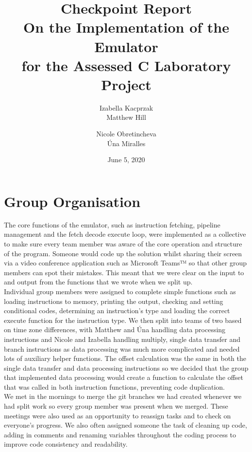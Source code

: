 \documentclass[11pt]{article}
\title{Checkpoint Report\\
\large On the Implementation of the Emulator \\
       for the Assessed C Laboratory Project}
\author{
    Izabella Kacprzak\\
    Matthew Hill
    \and 
    Nicole Obretincheva\\
    \'Una Miralles}
\date{June 5, 2020}
\begin{document}
\maketitle



\section{Group Organisation}
The core functions of the emulator, such as instruction fetching, pipeline management and the fetch decode execute loop, were implemented as a collective to make sure every team member was aware of the core operation and structure of the program. Someone would code up the solution whilst sharing their screen via a video conference application such as Microsoft Teams™ so that other group members can spot their mistakes. This meant that we were clear on the input to and output from the functions that we wrote when we split up.\\ 
\indent Individual group members were assigned to complete simple functions such as loading instructions to memory, printing the output, checking and setting conditional codes, determining an instruction’s type and loading the correct execute function for the instruction type. We then split into teams of two based on time zone differences, with Matthew and Úna handling data processing instructions and Nicole and Izabella handling multiply, single data transfer and branch instructions as data processing was much more complicated and needed lots of auxiliary helper functions. The offset calculation was the same in both the single data transfer and data processing instructions so we decided that the group that implemented data processing would create a function to calculate the offset that was called in both instruction functions, preventing code duplication.\\
\indent We met in the mornings to merge the git branches we had created whenever we had split work so every group member was present when we merged. These meetings were also used as an opportunity to reassign tasks and to check on everyone’s progress. We also often assigned someone the task of cleaning up code, adding in comments and renaming variables throughout the coding process to improve code consistency and readability.
\end{document}
